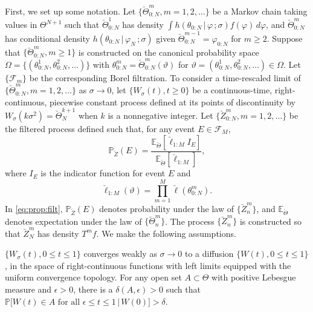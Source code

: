\documentclass{pnastwo}\usepackage[]{graphicx}\usepackage[]{color}
\newcommand\fzero{f}
\newcommand\given{{\, | \,}}
\newcommand\giventh{\,;}
\newcommand\lik{\ell}
\newcommand\Thetaspace{{\bbTheta}}
\newcommand\listB{B}
\newcommand{\bbTheta}{\Theta}
\newcommand{\conditionList}{ %
\setlength{\topsep}{1mm} \setlength{\itemsep}{0.5mm} \setlength{\parsep}{0cm}}
\newcommand\prob{\mathbb{P}}
\newcommand\E{\mathbb{E}}
\begin{document}
\begin{article}
First, we set up some notation.
Let $\{\breve\Theta_{0:N}^m,m=1,2,\dots\}$ be a Markov chain taking values in $\Thetaspace^{N+1}$ such that 
$\breve\Theta_{0:N}^1$ has density  $\int h(\theta_{0:N}\given\varphi\giventh\sigma)f(\varphi)\,d\varphi$, and $\breve\Theta_{0:N}^m$ has conditional density $h(\theta_{0:N}\given\varphi_N\giventh\sigma)$ given $\breve\Theta_{0:N}^{m-1}=\varphi_{0:N}$ for $m\ge 2$.
Suppose that $\{\breve\Theta_{0:N}^m,m\ge 1\}$ is constructed on the canonical probability space $\Omega=\{ (\theta_{0:N}^1,\theta_{0:N}^2,\dots)\}$ with $\theta_{0:N}^m=\breve\Theta_{0:N}^m(\vartheta)$ for $\vartheta=(\theta_{0:N}^1,\theta_{0:N}^2,\dots)\in\Omega$. 
Let $\{\mathcal{F}_m\}$ be the corresponding Borel filtration.
To consider a time-rescaled limit of $\{\breve\Theta_{0:N}^m,m=1,2,\dots\}$ as $\sigma\to 0$, let $\{W_\sigma(t),t\ge 0\}$ be a continuous-time, right-continuous, piecewise constant process defined at its points of discontinuity by $W_\sigma(k\sigma^2)=\breve\Theta^{k+1}_N$ when $k$ is a nonnegative integer.
Let $\{\breve Z_{0:N}^m,m=1,2,\dots\}$ be the filtered process defined such that, for any event $E\in\mathcal{F}_M$,
 \begin{equation} \label{eq:prop:filt}
\prob_{\breve Z}(E)= \frac{\E^{}_{\breve\Theta}[\breve\lik_{1:M}I^{}_{E}]}{\E^{}_{\breve\Theta}[\breve\lik_{1:M}]}, 
\end{equation}
where $I_E$ is the indicator function for event $E$ and
\begin{equation} \nonumber
\breve\lik_{1:M}(\vartheta)=\prod_{m=1}^{M} \breve\lik(\theta_{0:N}^m).
\end{equation}
In \eqref{eq:prop:filt}, $\prob_{\breve Z}(E)$ denotes probability under the law of $\{\breve Z_{n}^m\}$, and $\E_{\breve\Theta}$ denotes expectation under the law of $\{\breve\Theta_{n}^m\}$.
The process $\{\breve Z_{n}^m\}$ is constructed so that $\breve Z_{N}^m$ has density $T^m \fzero$.
We make the following assumptions.

\begin{list}{(\listB{})}{\conditionList}
\item \label{B1} $\{W_\sigma(t),0\le t\le 1\}$ converges weakly as $\sigma\to 0$ to a diffusion $\{W(t),0\le t\le 1\}$, in the space of right-continuous functions with left limits equipped with the uniform convergence topology.
For any open set $A\subset \Theta$ with positive Lebesgue measure and $\epsilon>0$, there is a $\delta(A,\epsilon)>0$ such that $\prob\big[W(t)\in A \mbox{ for all } \epsilon\le t\le 1\given W(0)\big]>\delta$.


\end{list}
\end{article}
\end{document}
